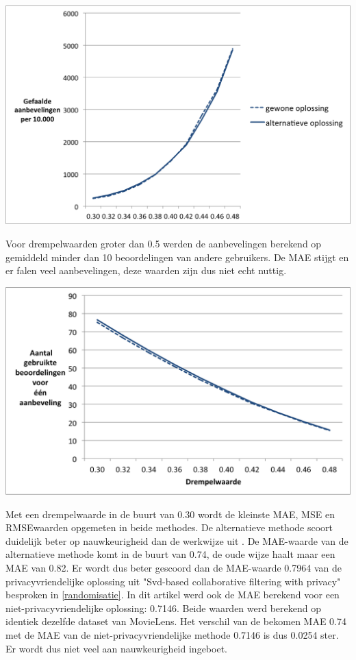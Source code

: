 \begin{center} 
\centering 
 \includegraphics[scale=0.6]{fig/failed}  
    \label{Figuur::failed} 
\end{center}
Voor drempelwaarden groter dan 0.5 werden de aanbevelingen berekend op gemiddeld minder dan 10 beoordelingen van andere gebruikers. De MAE stijgt en er falen veel aanbevelingen, deze waarden zijn dus niet echt nuttig.
\begin{center} 
\centering 
 \includegraphics[scale=0.5]{fig/usedratings}     \label{Figuur::usedratings}  
\end{center}

Met een drempelwaarde in de buurt van 0.30 wordt de kleinste MAE, MSE en RMSEwaarden opgemeten in beide methodes. De alternatieve methode scoort duidelijk beter op nauwkeurigheid dan de werkwijze uit \cite{ZErkinDyn}. De MAE-waarde van de alternatieve methode komt in de buurt van 0.74, de oude wijze haalt maar een MAE van 0.82. Er wordt dus beter gescoord dan  de MAE-waarde 0.7964 van de privacyvriendelijke oplossing uit "Svd-based collaborative filtering with privacy\cite{Polat:2005:SCF:1066677.1066860}" besproken in \ref{randomisatie}. In dit artikel werd ook de MAE berekend voor een niet-privacyvriendelijke oplossing: 0.7146. Beide waarden werd berekend op identiek dezelfde dataset van MovieLens. Het verschil van de bekomen MAE 0.74 met de MAE van de niet-privacyvriendelijke methode 0.7146 is dus 0.0254 ster. Er wordt dus niet veel aan nauwkeurigheid ingeboet.
